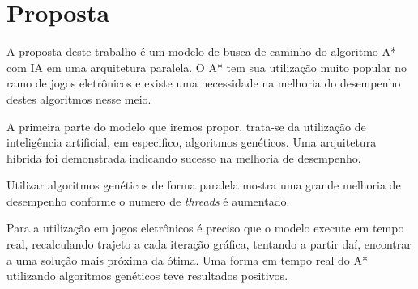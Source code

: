 
\chapter[Proposta]{Proposta}
A proposta deste trabalho é um modelo de busca de caminho do algoritmo A* com IA em uma arquitetura paralela. O A* tem sua utilização muito popular no ramo de jogos eletrônicos e existe uma necessidade na melhoria do desempenho destes algoritmos nesse meio. \cite{Ross_Graham}

A primeira parte do modelo que iremos propor, trata-se da utilização de inteligência artificial, em especifico, algoritmos genéticos. Uma arquitetura híbrida foi demonstrada indicando sucesso na melhoria de desempenho. \cite{Ryan}

Utilizar algoritmos genéticos de forma paralela mostra uma grande melhoria de desempenho conforme o numero de \textit{threads} é aumentado. \cite{Reza}

Para a utilização em jogos eletrônicos é preciso que o modelo execute em tempo real, recalculando trajeto a cada iteração gráfica, tentando a partir daí, encontrar a uma solução mais próxima da ótima. Uma forma em tempo real do A* utilizando algoritmos genéticos teve resultados positivos. \cite{Ulysses2}